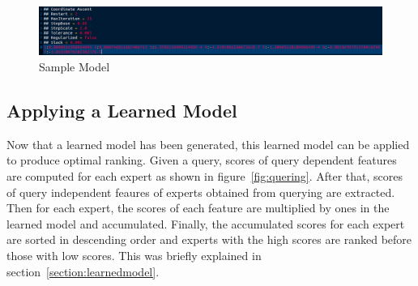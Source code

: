 \begin{figure}
\centering
\includegraphics[scale=0.3]{./figures/samplemodel.png}
\caption{Sample Model} \label{fig:samplemodel} 
\end{figure}

\subsection{Applying a Learned Model}\label{section:applyinglearnedmodel}
Now that a learned model has been generated, this learned model can be applied to produce optimal ranking. Given a query,
scores of query dependent features are computed for each expert as shown in figure~\ref{fig:quering}. After that, scores of query independent feaures
of experts obtained from querying are extracted. Then for each expert, the scores of each feature are multiplied by ones in the learned model and accumulated.
Finally, the accumulated scores for each expert are sorted in descending order and experts with the high scores are ranked before those with low scores. 
This was briefly explained in section~\ref{section:learnedmodel}.



